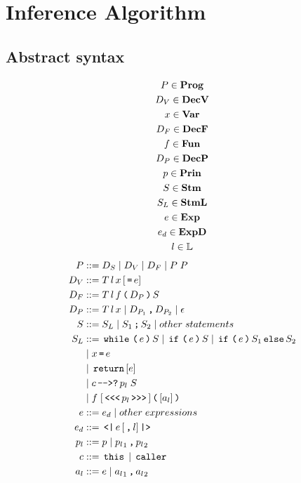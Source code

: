 
\section{Inference Algorithm}

\subsection{Abstract syntax}

\begin{gather*}
  P   \in \mathbf{Prog}\\
  D_V \in \mathbf{DecV}\\
  x   \in \mathbf{Var}\\
  D_F \in \mathbf{DecF} \\
  f   \in \mathbf{Fun}\\
  D_P \in \mathbf{DecP}\\
  p   \in \mathbf{Prin}\\
  S   \in \mathbf{Stm}\\
  S_L \in \mathbf{StmL}\\
  e   \in \mathbf{Exp}\\
  e_d \in \mathbf{ExpD}\\
  l   \in \mathbb{L}\\
\end{gather*}
\begin{align*}
  P       & ::= D_S \gp D_V \gp D_F \gp P \; P \\
  D_V     & ::= T \, l \, x \, [\tk = e] \\
  D_F     & ::= T \, l \, f \tk ( D_P \tk ) S \\
  D_P     & ::= T \, l \, x \gp D_{P_1} \tk , D_{P_2} \gp \epsilon \\
  S       & ::= S_L \gp S_1 \tk ; S_2 \gp other \; statements \\
  S_L     & ::= \tk{while} \tk ( e \tk ) S \gp \tk{if} \tk ( e \tk ) S \gp \tk{if} \tk ( e \tk ) S_1 \tk{else} S_2 \\
          & \gp x \tk = e \\
          & \gp \tk{return} [e] \\
          & \gp c \tk{-{}->?} p_l \; S \\
          & \gp f \; [\tk{<{}<{}<} p_l \tk{>{}>{}>}] \tk ( [a_l] \tk ) \\
  e       & ::= e_d \gp other \; expressions \\
  e_d     & ::= \tk{<|} e \, [\tk , l] \tk{|>} \\
  p_l     & ::= p \gp {p_l}_1 \tk , {p_l}_2 \\
  c       & ::= \tk{this} \gp \tk{caller} \\
  a_l     & ::= e \gp {a_l}_1 \tk , {a_l}_2
\end{align*}

